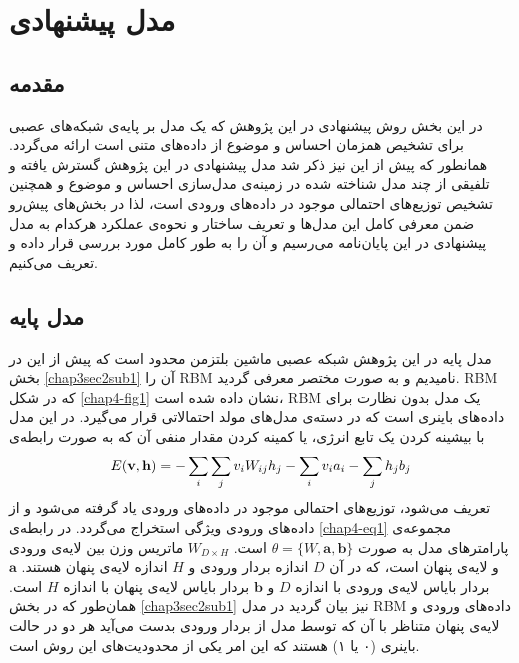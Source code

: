 \chapter{مدل پیشنهادی}
\thispagestyle{empty}
\section{مقدمه}
در این بخش روش پیشنهادی در این پژوهش که یک مدل بر پایه‌ی شبکه‌های عصبی برای تشخیص همزمان احساس و موضوع از داده‌های متنی است ارائه می‌‌گردد. همانطور که پیش از این نیز ذکر شد مدل پیشنهادی در این پژوهش گسترش یافته و تلفیقی از چند مدل شناخته شده در زمینه‌ی مدل‌سازی احساس و موضوع و همچنین تشخیص توزیع‌های احتمالی‌ موجود در داده‌های ورودی است، لذا در بخش‌های پیش‌ر‌‌و ضمن معرفی‌ کامل این مدل‌ها و تعریف ساختار و 
نحو‌ه‌ی عملکرد هرکدام به مدل پیشنهادی در این پایان‌‌نامه می‌‌رسیم و آن را به طور کامل مورد بررسی‌ قرار داده و تعریف می‌‌کنیم.

\section{مدل پایه}
\label{chap4sec2}
مدل پایه در این پژوهش  شبکه عصبی ماشین بلتزمن محدود است که پیش از این در بخش
\ref{chap3sec2sub1}
 آن را
RBM
نامیدیم و به صورت مختصر معرفی‌ گردید.
RBM
که در شکل
\ref{chap4-fig1}
نشان داده شده است،
 RBM 
 یک مدل بدون نظارت برای داده‌های باینری است که در دسته‌ی مدل‌های مولد احتمالاتی  قرار می‌گیرد. در این مدل با بیشینه کردن یک تابع انرژی، یا کمینه کردن مقدار منفی‌ آن که به صورت رابطه‌ی
\begin{align}
	\centering
	\label{chap4-eq1}
	E(\textbf{v},\textbf{h}) = -\sum_{i} \sum_{j} v_iW_{ij}h_j - \sum_i v_ia_i - \sum_j h_jb_j
\end{align}
تعریف می‌‌شود، توزیع‌های احتمالی‌ موجود در داده‌های ورودی یاد گرفته می‌شود و از داده‌های ورودی ویژگی‌ استخراج می‌‌گردد. در رابطه‌ی
\ref{chap4-eq1}
مجموعه‌ی پارامترهای مدل به صورت
$\theta = \{W, \textbf{a}, \textbf{b}\}$
است.
$W_{D \times H}$
ماتریس وزن بین لایه‌ی ورودی و لایه‌ی پنهان است، که در آن
$D$
اندازه بردار ورودی و
$H$
اندازه لایه‌ی پنهان هستند.
$\textbf{a}$
بردار بایاس لایه‌ی ورودی با اندازه
$D$
و
$\textbf{b}$
بردار بایاس لایه‌ی پنهان با اندازه
$H$
 است. همان‌طور که در بخش 
 \ref{chap3sec2sub1}
نیز بیان گردید در مدل
 RBM
 داده‌های ورودی و لایه‌ی پنهان متناظر با آن که توسط مدل از بردار ورودی بدست می‌‌آید هر دو در حالت باینری (۰ یا ۱) هستند که این امر یکی‌ از محدودیت‌های این روش است.


